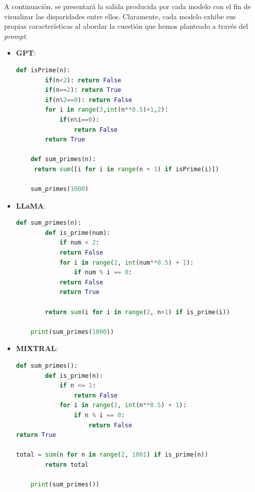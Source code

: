 \bigskip %

A continuación, se presentará la salida producida por cada modelo con el fin de visualizar las disparidades entre ellos. Claramente, cada modelo exhibe sus propias características al abordar la cuestión que hemos planteado a través del \textit{prompt}.
\begin{itemize}
    \item \textbf{\acrshort{GPT}}: 

    \begin{lstlisting}[language=Python, caption={Salida generada por GPT.}, label=listado7]
    def isPrime(n):
        if(n<2): return False
        if(n==2): return True
        if(n%2==0): return False
        for i in range(3,int(n**0.5)+1,2):
            if(n%i==0):
                return False            
        return True

    def sum_primes(n):
     return sum([i for i in range(n + 1) if isPrime(i)])

    sum_primes(1000)
    \end{lstlisting}

    
    \item \textbf{\acrshort{LLaMA}}:

    \begin{lstlisting}[language=Python, caption={Salida generada por LLaMA.}, label=listado8]
    def sum_primes(n):
        def is_prime(num):
            if num < 2:
            return False
            for i in range(2, int(num**0.5) + 1):
                if num % i == 0:
            return False
            return True

        return sum(i for i in range(2, n+1) if is_prime(i))

    print(sum_primes(1000))
    \end{lstlisting}
    
\item \textbf{MIXTRAL}:

    \begin{lstlisting}[language=Python, caption={Salida generada por MIXTRAL.}, label=listado9]
    def sum_primes():
        def is_prime(n):
            if n <= 1:
                return False
            for i in range(2, int(n**0.5) + 1):
                if n % i == 0:
                    return False
return True

total = sum(n for n in range(2, 1001) if is_prime(n))
        return total

    print(sum_primes())
    \end{lstlisting}
\end{itemize}

